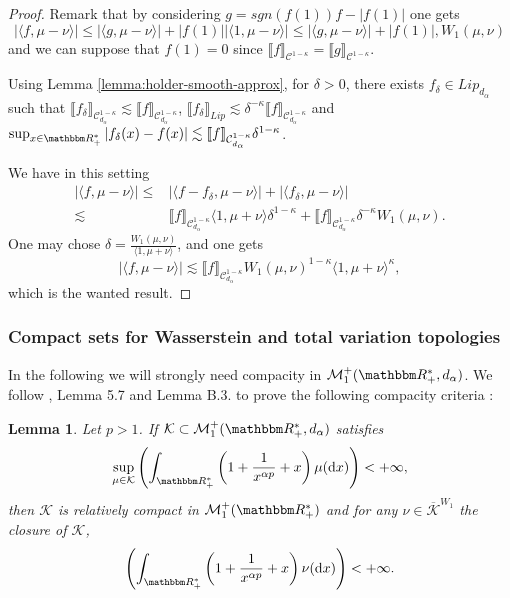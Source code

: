\documentclass[a4paper,11pt, reqno]{amsart}
\newcommand{\cC}{\mathcal{C}}	\newcommand{\CC}{\mathbbm{C}}
\newcommand{\cK}{\mathcal{K}}	\newcommand{\KK}{\mathbbm{K}}
\newcommand{\cM}{\mathcal{M}}	\newcommand{\MM}{\mathbbm{M}}
\newcommand{\dd}{\mathop{}\!\mathrm{d}}
\newcommand{\1}{\mathbbm{1}}
\theoremstyle{plain}
\newtheorem{lemma}[theorem]{Lemma}
\theoremstyle{definition}
\begin{document}
\begin{proof}
    Remark that by considering $g=sgn(f(1)) f - |f(1)|$  one gets
    \[|\langle f,\mu-\nu\rangle| \le |\langle g,\mu-\nu\rangle| + |f(1)| |\langle 1,\mu-\nu\rangle| \le |\langle g,\mu-\nu\rangle| + |f(1)| ,W_1(\mu,\nu)\]
    and we can suppose that $f(1)=0$ since $\llbracket f \rrbracket_{\cC^{1-\kappa}} = \llbracket g \rrbracket_{\cC^{1-\kappa}}$.
    
    Using Lemma \ref{lemma:holder-smooth-approx}, for $\delta>0$, there exists $f_\delta \in Lip_{d_\alpha}$ such that $\llbracket f_\delta\rrbracket_{\cC^{1-\kappa}_{d_\alpha}}\lesssim \llbracket f\rrbracket_{\cC^{1-\kappa}_{d_\alpha}}$, $\llbracket f_\delta\rrbracket_{Lip} \lesssim \delta^{-\kappa} \llbracket f\rrbracket_{\cC^{1-\kappa}_{d_\alpha}}$ and $\sup_{x\in\RR_+^*} |f_\delta(x)-f(x)| \lesssim \llbracket f\rrbracket_{\cC^{1-\kappa}_{d_\alpha}} \delta^{1-\kappa}$.

    We have in this setting
    \begin{align*}
        |\langle f,\mu-\nu\rangle| \le & 
            |\langle f-f_\delta,\mu-\nu\rangle| + |\langle f_\delta,\mu-\nu\rangle| \\
            \lesssim & \llbracket f\rrbracket_{\cC^{1-\kappa}_{d_\alpha}}  \langle 1, \mu + \nu \rangle \delta^{1-\kappa} + \llbracket f\rrbracket_{\cC^{1-\kappa}_{d_\alpha}} \delta^{-\kappa} W_1(\mu,\nu).
    \end{align*}
    One may chose $\delta = \frac{W_{1}(\mu,\nu)}{\langle 1, \mu + \nu \rangle}$, and one gets
    \[|\langle f,\mu-\nu\rangle| \lesssim \llbracket f\rrbracket_{\cC^{1-\kappa}_{d_\alpha}} W_1(\mu,\nu)^{1-\kappa} \langle 1, \mu + \nu \rangle^\kappa,\]
    which is the wanted result. 
\end{proof}

\subsubsection{Compact sets for Wasserstein and total variation topologies}

In the following we will strongly need compacity in $\cM_1^+
(\RR^{\ast}_+, d_{\alpha})$. We follow
{\cite{cardaliaguetNotesMeanField}}, Lemma 5.7 and
{\cite{claisseMeanFieldGames2023b}} Lemma B.3. to prove the following compacity criteria :

\begin{lemma}
  \label{lemma:compacity-wasserstein}Let $p > 1$. If $\cK \subset
  \cM_1^+ (\RR_+^{\ast}, d_{\alpha})$ satisfies
  \begin{equation}
    \underset{\mu \in \cK}{\sup} \left( \int_{\RR_+^*} \left( 1 +
    \frac{1}{x^{\alpha p}} + x \right) \mu (\dd x) \right) < + \infty,
    \label{eq:compacity-condition}
  \end{equation}
  then $\cK$ is relatively compact in $\cM_1^+
  (\RR_+^{\ast})$ and for any $\nu\in\overline{\cK}^{W_1}$ the closure of $\cK$,
  \[\left( \int_{\RR_+^*} \left( 1 +
    \frac{1}{x^{\alpha p}} + x \right) \nu (\dd x) \right) < + \infty.\]
\end{lemma}
\end{document}
